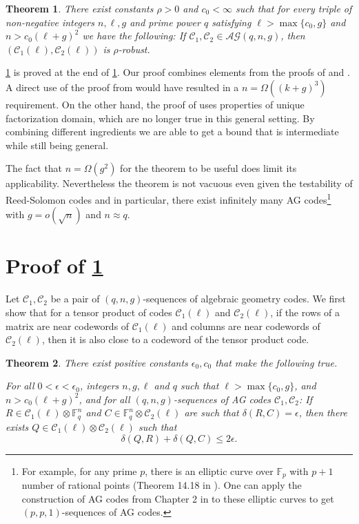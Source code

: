 \documentclass[11pt]{article}
\newcommand{\F}{\mathbb{F}}
\newcommand{\C}{\mathcal{C}}
\newcommand{\AG}{\mathcal{AG}}
\newtheorem{theorem}{Theorem}[section]
\newcommand{\gnote}[1]{{\color{red} [Gabe: #1]}}
\newcommand{\mnote}[1]{{\color{teal} [Madhu: #1]}}
\newcommand{\gnote}[1]{}
\newcommand{\mnote}[1]{}
\begin{document}
\begin{theorem}
\label{theorem_robust}
    There exist constants $\rho > 0$ and $c_0 < \infty$ such that for every triple of non-negative integers $n,\ell,g$ and prime power $q$ satisfying $\ell > \max\{c_0, g\}$ and $n > c_0(\ell+g)^2$ we have the following: If $\C_1,\C_2 \in \AG(q,n,g)$, then $(\C_1(\ell),\C_2(\ell))$ is $\rho$-robust. 
\end{theorem}

\cref{theorem_robust} is proved at the end of \cref{sec:proof-main}. Our proof combines elements from the proofs of \cite{AroSaf} and \cite{PolSpi}. A direct use of the proof from \cite{AroSaf} would have resulted in a $n = \Omega((k+g)^3)$ requirement. On the other hand, the proof of \cite{PolSpi} uses properties of unique factorization domain, which are no longer true in this general setting. By combining different ingredients we are able to get a bound that is intermediate while still being general. 

The fact that $n = \Omega(g^2)$ for the theorem to be useful does limit its applicability. Nevertheless the theorem is not vacuous even given the testability of Reed-Solomon codes and in particular, there exist infinitely many AG codes\footnote{For example, for any prime $p$, there is an elliptic curve over $\F_p$ with $p+1$ number of rational points (Theorem 14.18 in \cite{cox2022primes}). One can apply the construction of AG codes from Chapter 2 in \cite{stichtenoth2009algebraic} to these elliptic curves to get  $(p,p,1)$-sequences of AG codes.} with $g = o(\sqrt{n})$ and $n \approx q$.
 

\section{Proof of {\protect \cref{theorem_robust}}}\label{sec:proof-main}


Let $\C_1,\C_2$ be a pair of $(q,n,g)$-sequences of algebraic geometry codes. We first show that for a tensor product of codes $\C_1(\ell)$ and $\C_2(\ell)$, if the rows of a matrix are near codewords of $\C_1(\ell)$ and columns are near codewords of $\C_2(\ell)$, then it is also close to a codeword of the tensor product code.
\begin{theorem}
\label{theorem_main}
There exist positive constants $\epsilon_0, c_0$ that make the following true.

For all $0 < \epsilon < \epsilon_0$, integers $n, g, \ell$ and $q$ such that $\ell > \max\{c_0, g\}$, and $n > c_0 (\ell + g)^2$, and for all $(q,n,g)$-sequences of AG codes $\C_1,\C_2$: If $R\in \C_1(\ell) \otimes \F_q^n$ and $C \in \F_q^n \otimes \C_2(\ell)$ are such that $\delta(R,C)=\epsilon$, then there exists $Q\in \C_1(\ell)\otimes \C_2(\ell)$ such that 
\[\delta(Q,R) + \delta(Q, C) \le 2\epsilon.\]
\end{theorem}
\end{document}
